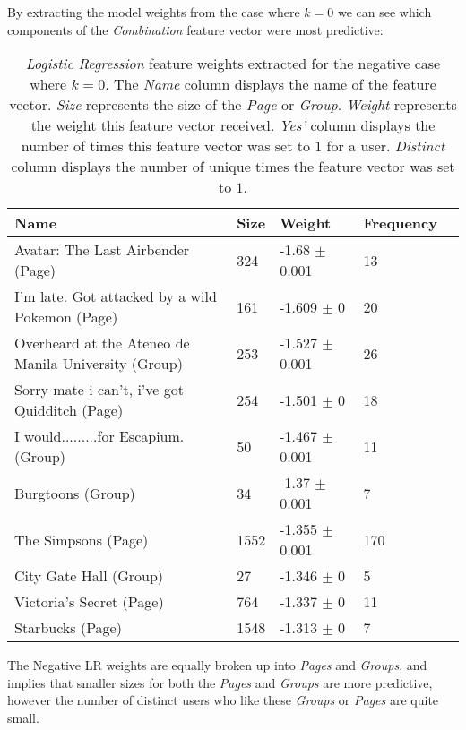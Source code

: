 By extracting the model weights from the case where $k=0$ we can see which components of the \emph{Combination} feature vector were most
predictive:
\begin{table}[h]
\begin{minipage}[b]{1.0\textwidth}
\centering
  \begin{tabular}{|l|l|l|l|l|} %
  \hline
  \textbf{Name} & \textbf{Size} & \textbf{Weight} & \textbf{Frequency} \\ \hline

Avatar: The Last Airbender (Page) & 324 & -1.68 $\pm$ 0.001 & 13 \\ \hline
I'm late. Got attacked by a wild Pokemon (Page) & 161 & -1.609 $\pm$ 0 & 20 \\ \hline
Overheard at the Ateneo de Manila University (Group) & 253 & -1.527 $\pm$ 0.001 & 26 \\ \hline
Sorry mate i can't, i've got Quidditch (Page) & 254 & -1.501 $\pm$ 0 & 18 \\ \hline
I would.........for Escapium. (Group) & 50 & -1.467 $\pm$ 0.001 & 11 \\ \hline
Burgtoons (Group) & 34 & -1.37 $\pm$ 0.001 & 7 \\ \hline
The Simpsons (Page) & 1552 & -1.355 $\pm$ 0.001 & 170 \\ \hline
City Gate Hall (Group) & 27 & -1.346 $\pm$ 0 & 5 \\ \hline
Victoria's Secret (Page) & 764 & -1.337 $\pm$ 0 & 11 \\ \hline
Starbucks (Page) & 1548 & -1.313 $\pm$ 0 & 7 \\ \hline
  \end{tabular}
  \caption{\emph{Logistic Regression} feature weights extracted for the negative case where $k=0$. The \emph{Name} column displays the name of the feature vector.
                        \emph{Size} represents the size of the \emph{Page} or \emph{Group}.
                        \emph{Weight} represents the weight this feature vector received.  
                        \emph{Yes'} column displays the number of times this feature vector was set to $1$ for a user.
                        \emph{Distinct} column displays the number of unique times the feature vector was set to $1$.}
\end{minipage}
\end{table}

The Negative LR weights are equally broken up into \emph{Pages} and \emph{Groups}, and implies that smaller sizes for both the \emph{Pages}
and \emph{Groups} are more predictive, however the number of distinct users who like these \emph{Groups} or \emph{Pages} are quite small.

